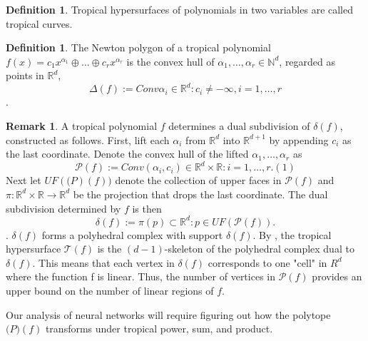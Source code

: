\documentclass{article}
\theoremstyle{definition}
\newtheorem{definition}[theorem]{Definition}
\newtheorem{remark}[theorem]{Remark}
\begin{document}
\begin{definition}\cite[p.~3]{zhang2018tropical}
Tropical hypersurfaces of polynomials in two variables are called tropical curves.
\end{definition}

\begin{definition}\cite[p.~3]{zhang2018tropical}
The Newton polygon of a tropical polynomial $f(x) = c_1 x^{\alpha_1} \oplus \dots \oplus c_r x^{\alpha_r}$  is the convex hull of $\alpha_1 , \dots , \alpha_r \in \mathbb{N}^{d}$, regarded as points in $\mathbb{R}^{d}$,
$$ \Delta(f) := Conv{\alpha_i \in \mathbb{R}^{d} : c_i \neq -\infty , i = 1, \dots ,r } $$.
\end{definition}

\begin{remark}\cite[p.~3]{zhang2018tropical}
A tropical polynomial $f$ determines a dual subdivision of
$\delta (f)$, constructed as follows. First, lift each $\alpha_i$ from $\mathbb{R}^d$ into $\mathbb{R}^{d+1}$ by appending $c_i$ as the last coordinate. Denote the convex hull of the lifted $\alpha_1, \dots , \alpha_r$ as
$$\mathcal{P}(f):= Conv{(\alpha_i, c_i) \in \mathbb{R}^{d} \times \mathbb{R} : i = 1, \dots , r}. (1)$$
Next let $UF(\mathcal(P)(f))$ denote the collection of upper faces in $\mathcal{P}(f)$ and $\pi : \mathbb{R}^{d} \times \mathbb{R} \to \mathbb{R}^{d}$ be the projection that drops
the last coordinate. The dual subdivision determined by $f$
is then
$$\delta(f) := {\pi(p) \subset \mathbb{R}^{d} : p \in UF( \mathcal{P}(f))}.$$.
$\delta (f)$ forms a polyhedral complex with support $\delta (f)$. By \cite{maclagan2015introduction}, the tropical hypersurface $\mathcal{T}(f)$ is the $(d - 1)$-skeleton of the polyhedral complex dual to $ \delta(f)$. This means that each vertex in $ \delta(f)$ corresponds to one "cell" in $R^{d}$ where the function f is linear. Thus, the number of vertices in $\mathcal{P}(f)$ provides an upper bound on the number of linear regions of $f$.
\end{remark}

Our analysis of neural networks will require figuring out
how the polytope $\mathcal(P)(f)$ transforms under tropical power,
sum, and product.
\end{document}
